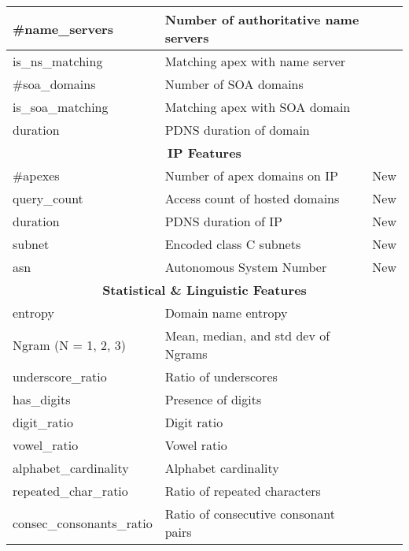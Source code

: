 \begin{table}[htbp]
{\begin{tabular}{|p{3cm}|p{4cm}|c|}
\#name\_servers & Number of authoritative name servers & \cite{phicious:raid:2022, comp_or_at:2021:usenix}\\ \hline
is\_ns\_matching & Matching apex with name server & \cite{phicious:raid:2022}\\ \hline
\#soa\_domains & Number of SOA domains & \cite{comp_or_at:2021:usenix}\\ \hline
is\_soa\_matching & Matching apex with SOA domain & \cite{comp_or_at:2021:usenix}\\ \hline
duration & PDNS duration of domain & \cite{phicious:raid:2022, Exposure_Bilge2011}\\ \hline
\multicolumn{3}{|c|}{\textbf{IP Features}} \\ \hline
\#apexes & Number of apex domains on IP & New \\ \hline
query\_count & Access count of hosted domains & New \\ \hline
duration & PDNS duration of IP & New \\ \hline
subnet & Encoded class C subnets & New \\ \hline
asn & Autonomous System Number & New \\ \hline
\multicolumn{3}{|c|}{\textbf{Statistical \& Linguistic Features}} \\ \hline
entropy & Domain name entropy & \cite{comar:esp:2020, phicious:raid:2022, practicalattacks:SP:2024}\\ \hline
N\-gram (N = 1, 2, 3) & Mean, median, and std dev of N\-grams &  \cite{Notos_Antonakakis2010, ringer:ICCS:2020}\\ \hline
underscore\_ratio & Ratio of underscores & \cite{phicious:raid:2022, ringer:ICCS:2020}\\ \hline
has\_digits & Presence of digits & \cite{Exposure_Bilge2011, phicious:raid:2022, ringer:ICCS:2020}\\ \hline
digit\_ratio & Digit ratio & \cite{Exposure_Bilge2011, phicious:raid:2022, ringer:ICCS:2020}\\ \hline
vowel\_ratio & Vowel ratio & \cite{ringer:ICCS:2020}\\ \hline
alphabet\_cardinality & Alphabet cardinality & \cite{ringer:ICCS:2020}\\ \hline
repeated\_char\_ratio & Ratio of repeated characters & \cite{ringer:ICCS:2020}\\ \hline
consec\_consonants\_ratio & Ratio of consecutive consonant pairs &  \cite{ringer:ICCS:2020}\\ \hline
\end{tabular}
}
\end{table}


